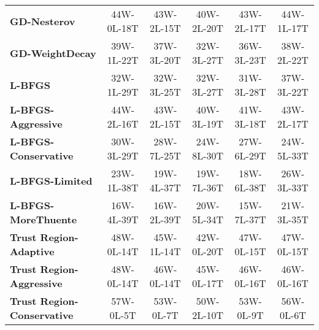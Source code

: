 \documentclass{article}
\begin{document}
\begin{table}[htbp]
{\begin{tabular}{lccccc}
\textbf{GD-Nesterov} & \textcolor{green!70!black}{44W-0L-18T} & \textcolor{green!70!black}{43W-2L-15T} & \textcolor{green!70!black}{40W-2L-20T} & \textcolor{green!70!black}{43W-2L-17T} & \textcolor{green!70!black}{44W-1L-17T} \\
\textbf{GD-WeightDecay} & \textcolor{green!70!black}{39W-1L-22T} & \textcolor{green!70!black}{37W-3L-20T} & \textcolor{green!70!black}{32W-3L-27T} & \textcolor{green!70!black}{36W-3L-23T} & \textcolor{green!70!black}{38W-2L-22T} \\
\textbf{L-BFGS} & \textcolor{green!70!black}{32W-1L-29T} & \textcolor{green!70!black}{32W-3L-25T} & \textcolor{green!70!black}{32W-3L-27T} & \textcolor{green!70!black}{31W-3L-28T} & \textcolor{green!70!black}{37W-3L-22T} \\
\textbf{L-BFGS-Aggressive} & \textcolor{green!70!black}{44W-2L-16T} & \textcolor{green!70!black}{43W-2L-15T} & \textcolor{green!70!black}{40W-3L-19T} & \textcolor{green!70!black}{41W-3L-18T} & \textcolor{green!70!black}{43W-2L-17T} \\
\textbf{L-BFGS-Conservative} & \textcolor{green!70!black}{30W-3L-29T} & \textcolor{green!70!black}{28W-7L-25T} & \textcolor{green!70!black}{24W-8L-30T} & \textcolor{green!70!black}{27W-6L-29T} & \textcolor{green!70!black}{24W-5L-33T} \\
\textbf{L-BFGS-Limited} & \textcolor{green!70!black}{23W-1L-38T} & \textcolor{green!70!black}{19W-4L-37T} & \textcolor{green!70!black}{19W-7L-36T} & \textcolor{green!70!black}{18W-6L-38T} & \textcolor{green!70!black}{26W-3L-33T} \\
\textbf{L-BFGS-MoreThuente} & \textcolor{green!70!black}{16W-4L-39T} & \textcolor{green!70!black}{16W-2L-39T} & \textcolor{green!70!black}{20W-5L-34T} & \textcolor{green!70!black}{15W-7L-37T} & \textcolor{green!70!black}{21W-3L-35T} \\
\textbf{Trust Region-Adaptive} & \textcolor{green!70!black}{48W-0L-14T} & \textcolor{green!70!black}{45W-1L-14T} & \textcolor{green!70!black}{42W-0L-20T} & \textcolor{green!70!black}{47W-0L-15T} & \textcolor{green!70!black}{47W-0L-15T} \\
\textbf{Trust Region-Aggressive} & \textcolor{green!70!black}{48W-0L-14T} & \textcolor{green!70!black}{46W-0L-14T} & \textcolor{green!70!black}{45W-0L-17T} & \textcolor{green!70!black}{46W-0L-16T} & \textcolor{green!70!black}{46W-0L-16T} \\
\textbf{Trust Region-Conservative} & \textcolor{green!70!black}{57W-0L-5T} & \textcolor{green!70!black}{53W-0L-7T} & \textcolor{green!70!black}{50W-2L-10T} & \textcolor{green!70!black}{53W-0L-9T} & \textcolor{green!70!black}{56W-0L-6T} \\

\end{tabular}}
\end{table}
\end{document}
